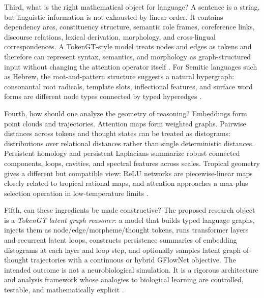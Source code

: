 \documentclass[11pt]{article}
\newcommand{\1}{\mathbf{1}}
\begin{document}
Third, what is the right mathematical object for language? A sentence is a string, but linguistic information is not exhausted by linear order. It contains dependency arcs, constituency structure, semantic role frames, coreference links, discourse relations, lexical derivation, morphology, and cross-lingual correspondences. A TokenGT-style model treats nodes and edges as tokens and therefore can represent syntax, semantics, and morphology as graph-structured input without changing the attention operator itself \cite{KimTokenGT2022}. For Semitic languages such as Hebrew, the root-and-pattern structure suggests a natural hypergraph: consonantal root radicals, template slots, inflectional features, and surface word forms are different node types connected by typed hyperedges \cite{Daya2008,Hatch2025,Samo2026}.

Fourth, how should one analyze the geometry of reasoning? Embeddings form point clouds and trajectories. Attention maps form weighted graphs. Pairwise distances across tokens and thought states can be treated as distograms: distributions over relational distances rather than single deterministic distances. Persistent homology and persistent Laplacians summarize robust connected components, loops, cavities, and spectral features across scales. Tropical geometry gives a different but compatible view: ReLU networks are piecewise-linear maps closely related to tropical rational maps, and attention approaches a max-plus selection operation in low-temperature limits \cite{ZhangTropical2018,Brandenburg2024,HashemiTropicalAttention2025,TransformerTropical2026,Chazal2016,WeiPersistentLaplacian2023,Draganov2024,TDA_NLP_Survey2025}.

Fifth, can these ingredients be made constructive? The proposed research object is a \emph{TokenGT latent graph reasoner}: a model that builds typed language graphs, injects them as node/edge/morpheme/thought tokens, runs transformer layers and recurrent latent loops, constructs persistence summaries of embedding distograms at each layer and loop step, and optionally samples latent graph-of-thought trajectories with a continuous or hybrid GFlowNet objective. The intended outcome is not a neurobiological simulation. It is a rigorous architecture and analysis framework whose analogies to biological learning are controlled, testable, and mathematically explicit \cite{BestaGoT2023,Lahlou2023,Younsi2025,GraphThoughtsSurvey2024}.
\end{document}
